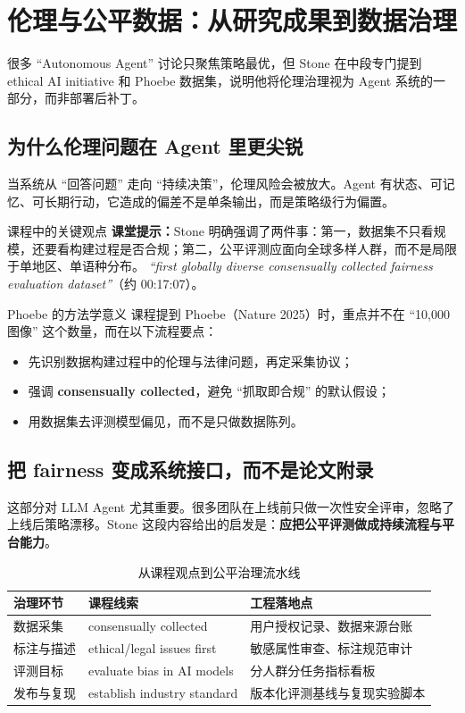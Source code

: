 \section{伦理与公平数据：从研究成果到数据治理}

很多 ``Autonomous Agent'' 讨论只聚焦策略最优，但 Stone 在中段专门提到 ethical AI initiative 和 Phoebe 数据集，说明他将伦理治理视为 Agent 系统的一部分，而非部署后补丁。

\subsection{为什么伦理问题在 Agent 里更尖锐}
当系统从 ``回答问题'' 走向 ``持续决策''，伦理风险会被放大。Agent 有状态、可记忆、可长期行动，它造成的偏差不是单条输出，而是策略级行为偏置。

\begin{importantbox}{课程中的关键观点}
\textbf{课堂提示：}Stone 明确强调了两件事：第一，数据集不只看规模，还要看构建过程是否合规；第二，公平评测应面向全球多样人群，而不是局限于单地区、单语种分布。
\textit{``first globally diverse consensually collected fairness evaluation dataset''}（约 00:17:07）。
\end{importantbox}

\begin{knowledgebox}{Phoebe 的方法学意义}
课程提到 Phoebe（Nature 2025）时，重点并不在 ``10,000 图像'' 这个数量，而在以下流程要点：
\begin{itemize}
    \item 先识别数据构建过程中的伦理与法律问题，再定采集协议；
    \item 强调 \textbf{consensually collected}，避免 ``抓取即合规'' 的默认假设；
    \item 用数据集去评测模型偏见，而不是只做数据陈列。
\end{itemize}
\end{knowledgebox}

\subsection{把 fairness 变成系统接口，而不是论文附录}
这部分对 LLM Agent 尤其重要。很多团队在上线前只做一次性安全评审，忽略了上线后策略漂移。Stone 这段内容给出的启发是：\textbf{应把公平评测做成持续流程与平台能力}。

\begin{table}[H]
\centering
\begin{tabular}{p{3.2cm}p{4.6cm}p{4.2cm}}
\toprule
\textbf{治理环节} & \textbf{课程线索} & \textbf{工程落地点} \\
\midrule
数据采集 & consensually collected & 用户授权记录、数据来源台账 \\
标注与描述 & ethical/legal issues first & 敏感属性审查、标注规范审计 \\
评测目标 & evaluate bias in AI models & 分人群分任务指标看板 \\
发布与复现 & establish industry standard & 版本化评测基线与复现实验脚本 \\
\bottomrule
\end{tabular}
\caption{从课程观点到公平治理流水线}
\end{table}

